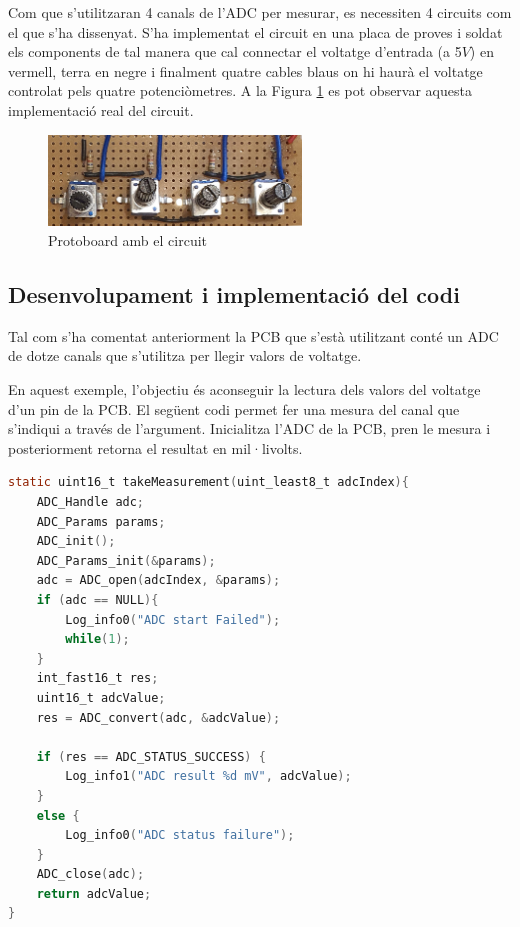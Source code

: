 Com que s'utilitzaran 4 canals de l'ADC per mesurar, es necessiten 4 circuits com el que s'ha dissenyat.
S'ha implementat el circuit en una placa de proves i soldat els components de tal manera que cal connectar el voltatge d'entrada (a 5$V$) en vermell, terra en negre i finalment quatre cables blaus on hi haurà el voltatge controlat pels quatre potenciòmetres.
A la Figura \ref{protoboard} es pot observar aquesta implementació real del circuit.

\begin{figure}[!h]
	\begin{center}
		\includegraphics[width=0.6\textwidth]{./images/sensors_circuit.jpg}
		\caption{Protoboard amb el circuit}
		\label{protoboard}
	\end{center}
\end{figure}

\subsection{Desenvolupament i implementació del codi}

Tal com s'ha comentat anteriorment la PCB que s'està utilitzant conté un ADC de dotze canals que s'utilitza per llegir valors de voltatge.

En aquest exemple, l'objectiu és aconseguir la lectura dels valors del voltatge d'un pin de la PCB.
El següent codi permet fer una mesura del canal que s'indiqui a través de l'argument.
Inicialitza l'ADC de la PCB, pren le mesura i posteriorment retorna el resultat en mil·livolts.

\begin{lstlisting}[language=C]
static uint16_t takeMeasurement(uint_least8_t adcIndex){
	ADC_Handle adc;
	ADC_Params params;
	ADC_init();
	ADC_Params_init(&params);
	adc = ADC_open(adcIndex, &params);
	if (adc == NULL){
		Log_info0("ADC start Failed");
		while(1);
	}
	int_fast16_t res;
	uint16_t adcValue;
	res = ADC_convert(adc, &adcValue);
	
	if (res == ADC_STATUS_SUCCESS) {
		Log_info1("ADC result %d mV", adcValue);
	}
	else {
		Log_info0("ADC status failure");
	}
	ADC_close(adc);
	return adcValue;
}
\end{lstlisting}

